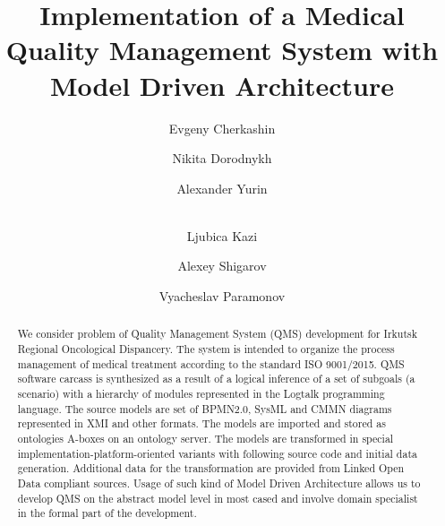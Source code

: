 \documentclass{llncs}
\begin{document}
\title{Implementation of a Medical Quality Management System with Model Driven Architecture}


\author{Evgeny Cherkashin\and
Nikita Dorodnykh\and
Alexander Yurin\and\\
Ljubica Kazi\and
Alexey Shigarov\and
Vyacheslav Paramonov
}




\maketitle

\begin{abstract} %
We consider problem of Quality Management System (QMS) development for Irkutsk Regional Oncological Dispancery.  The system is intended to organize the process management of medical treatment according to the standard ISO 9001/2015.  QMS software carcass is synthesized as a result of a logical inference of a set of subgoals (a scenario) with a hierarchy of modules represented in the Logtalk programming language.  The source models are set of BPMN2.0, SysML and CMMN diagrams represented in XMI and other formats.  The models are imported and stored as ontologies A-boxes on an ontology server.  The models are transformed in special implementation-platform-oriented variants with following source code and initial data generation.  Additional data for the transformation are provided from Linked Open Data compliant sources.  Usage of such kind of Model Driven Architecture allows us to develop QMS on the abstract model level in most cased and involve domain specialist in the formal part of the development.


\end{abstract}
\end{document}

